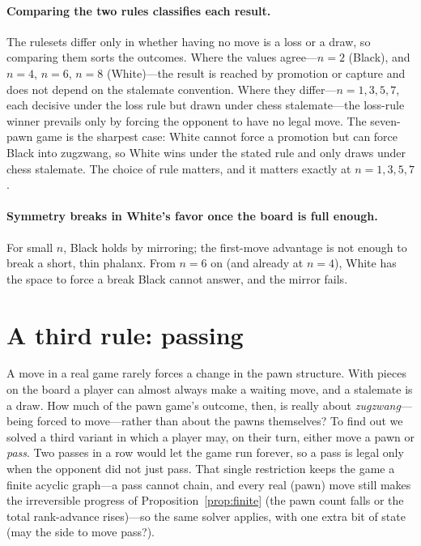 \documentclass[Afour,sageapa,times]{sagej}
\theoremstyle{plain}
\theoremstyle{definition}
\begin{document}
\paragraph{Comparing the two rules classifies each result.} The rulesets differ
only in whether having no move is a loss or a draw, so comparing them sorts the
outcomes. Where the values agree---$n=2$ (Black), and $n=4$, $n=6$, $n=8$
(White)---the result is reached by promotion or capture and does not depend on the
stalemate convention. Where they differ---$n=1,3,5,7$, each decisive under the loss
rule but drawn under chess stalemate---the loss-rule winner prevails only by forcing
the opponent to have no legal move. The seven-pawn game is the sharpest case: White
cannot force a promotion but can force Black into zugzwang, so White wins under
the stated rule and only draws under chess stalemate. The choice of rule matters,
and it matters exactly at $n=1,3,5,7$.

\paragraph{Symmetry breaks in White's favor once the board is full enough.} For
small $n$, Black holds by mirroring; the first-move advantage is not enough to
break a short, thin phalanx. From $n=6$ on (and already at $n=4$), White has the
space to force a break Black cannot answer, and the mirror fails.

\section{A third rule: passing}\label{sec:pass}

A move in a real game rarely forces a change in the pawn structure. With pieces on
the board a player can almost always make a waiting move, and a stalemate is a draw.
How much of the pawn game's outcome, then, is really about \emph{zugzwang}---being
forced to move---rather than about the pawns themselves? To find out we solved a
third variant in which a player may, on their turn, either move a pawn or
\emph{pass}. Two passes in a row would let the game run forever, so a pass is legal
only when the opponent did not just pass. That single restriction keeps the game a
finite acyclic graph---a pass cannot chain, and every real (pawn) move still makes
the irreversible progress of Proposition~\ref{prop:finite} (the pawn count falls or
the total rank-advance rises)---so the same solver applies, with one extra bit of
state (may the side to move pass?).
\end{document}
